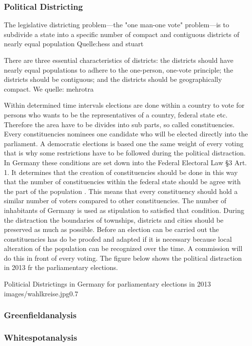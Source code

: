 \subsubsection{Political Districting}
The legislative
districting problem—the "one man-one vote" problem—is to subdivide a state into a
specific number of compact and contiguous districts of nearly equal population 
Quelle:hess and stuart


There are three essential characteristics of districts:
the districts should have nearly equal populations to
adhere to the one-person, one-vote principle; the districts
should be contiguous; and the districts should be
geographically compact. We
quelle: mehrotra

Within determined time intervals elections are done within a country to vote for persons who wants to be the representatives of a country, federal state etc. Therefore the area have to be divides into sub parts, so called constituencies. Every constituencies nominees one candidate who will be elected directly into the parliament.  A democratic elections is based one the same weight of every voting that is why some restrictions have to be followed during the political distraction. In Germany these conditions are set down into the Federal Electoral Law §3 Art. 1. It determines that the creation of constituencies should be done in this way that the number of constituencies within the federal state should be agree with the part of the population \cite{bund}. This means that every constituency should hold a similar number of voters compared to other constituencies. The number of inhabitants of Germany is used as stipulation to satisfied that condition. During the distraction the boundaries of townships, districts and cities should be preserved as much as possible. Before an election can be carried out the constituencies has do be proofed and adapted if it is necessary because local alteration of the population can be recognized over the time. A commission will do this in front of every voting. The figure below shows the political distraction in 2013 fr the parliamentary elections.


\begin{figurevarSize}{Politicial Districtings in Germany for parliamentary elections in 2013 \cite{bund}}{images/wahlkreise.jpg}{0.7}\end{figurevarSize}


\subsubsection{Greenfieldanalysis}
\subsubsection{Whitespotanalysis}
